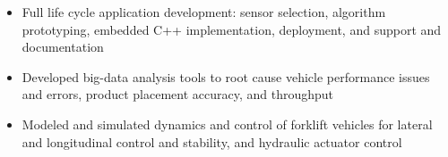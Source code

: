 	\begin{itemize} [leftmargin = \itemmargin]
				
		\item Full life cycle application development: sensor selection, algorithm prototyping, embedded C++ implementation, deployment, and support and documentation
			
		\item Developed big-data analysis tools to root cause vehicle performance issues and errors, product placement accuracy, and throughput

		\item Modeled and simulated dynamics and control of forklift vehicles for lateral and longitudinal control and stability, and hydraulic actuator control

	\end{itemize} \\